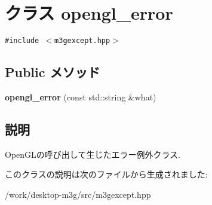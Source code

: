 \hypertarget{classm3g_1_1opengl__error}{
\section{クラス opengl\_\-error}
\label{classm3g_1_1opengl__error}
}
{\tt \#include $<$m3gexcept.hpp$>$}

\subsection*{Public メソッド}
\begin{CompactItemize}
\item 
\hypertarget{classm3g_1_1opengl__error_ffe0f8c69cc4706e33b9360cdece7561}{
\textbf{opengl\_\-error} (const std::string \&what)}
\label{classm3g_1_1opengl__error_ffe0f8c69cc4706e33b9360cdece7561}

\end{CompactItemize}


\subsection{説明}
OpenGLの呼び出して生じたエラー例外クラス. 

このクラスの説明は次のファイルから生成されました:\begin{CompactItemize}
\item 
/work/desktop-m3g/src/m3gexcept.hpp\end{CompactItemize}

